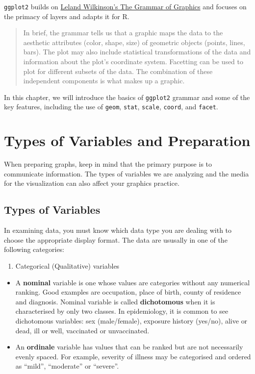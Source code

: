 \documentclass[]{book}
\providecommand{\tightlist}{%
  \setlength{\itemsep}{0pt}\setlength{\parskip}{0pt}}
\begin{document}
\texttt{ggplot2} builds on
\href{https://stanford.idm.oclc.org/login?url=http://www.myilibrary.com?id=46066}{Leland
Wilkinson's The Grammar of Graphics} and focuses on the primacy of
layers and adapts it for R.

\begin{quote}
In brief, the grammar tells us that a graphic maps the data to the
aesthetic attributes (color, shape, size) of geometric objects (points,
lines, bars). The plot may also include statistical transformations of
the data and information about the plot's coordinate system. Facetting
can be used to plot for different subsets of the data. The combination
of these independent components is what makes up a graphic.
\end{quote}

In this chapter, we will introduce the basics of \texttt{ggplot2}
grammar and some of the key features, including the use of
\texttt{geom}, \texttt{stat}, \texttt{scale}, \texttt{coord}, and
\texttt{facet}.

\section{Types of Variables and
Preparation}\label{types-of-variables-and-preparation}

When preparing graphs, keep in mind that the primary purpose is to
communicate information. The types of variables we are analyzing and the
media for the visualization can also affect your graphics practice.

\subsection{Types of Variables}\label{types-of-variables}

In examining data, you must know which data type you are dealing with to
choose the appropriate display format. The data are ususally in one of
the following categories:

\begin{enumerate}
\def\labelenumi{\arabic{enumi}.}
\tightlist
\item
  Categorical (Qualitative) variables
\end{enumerate}

\begin{itemize}
\item
  A \textbf{nominal} variable is one whose values are categories without
  any numerical ranking. Good examples are occupation, place of birth,
  county of residence and diagnosis. Nominal variable is called
  \textbf{dichotomous} when it is characterised by only two classes. In
  epidemiology, it is common to see dichotomous variables: sex
  (male/female), exposure history (yes/no), alive or dead, ill or well,
  vaccinated or unvaccinated.
\item
  An \textbf{ordinale} variable has values that can be ranked but are
  not necessarily evenly spaced. For example, severity of illness may be
  categorised and ordered as ``mild'', ``moderate'' or ``severe''.
\end{itemize}
\end{document}
